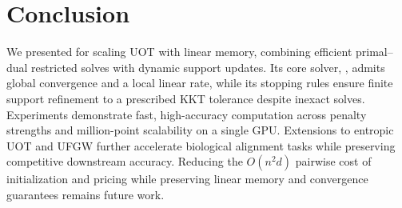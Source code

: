 \section{Conclusion}
We presented \ours for scaling UOT with linear memory, combining efficient primal--dual restricted solves with dynamic support updates.
Its core solver, \subsolver, admits global convergence and a local linear rate, while its stopping rules ensure finite support refinement to a prescribed KKT tolerance despite inexact solves.
Experiments demonstrate fast, high-accuracy computation across penalty strengths and million-point scalability on a single GPU.
Extensions to entropic UOT and UFGW further accelerate biological alignment tasks while preserving competitive downstream accuracy.
Reducing the $O(n^2d)$ pairwise cost of initialization and pricing while preserving linear memory and convergence guarantees remains future work.

